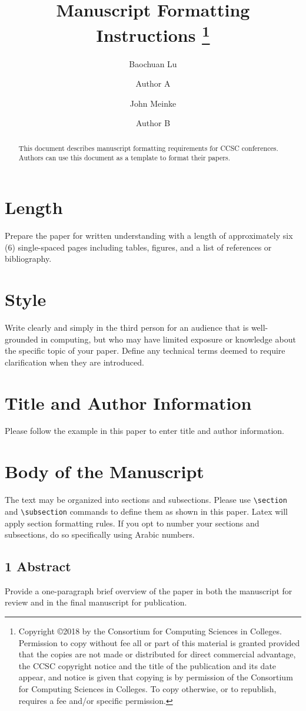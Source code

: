 \documentclass{ccsc_paper}
\title{Manuscript Formatting Instructions
\footnote{
Copyright \copyright 2018 by the Consortium for Computing Sciences in Colleges. Permission to copy without fee all or part of this material is granted provided that the copies are not made or distributed for direct commercial advantage, the CCSC copyright notice and the title of the publication and its date appear, and notice is given that copying is by permission of the Consortium for Computing Sciences in Colleges. To copy otherwise, or to republish, requires a fee and/or specific permission.}}
\author[1]{Baochuan Lu}
\author[1]{Author A}
\author[2]{John Meinke}
\author[2]{Author B}
\affil[1]{\footnotesize
Computer and Information Sciences \protect\\
Southwest Baptist University \protect\\
Bolivar, MO 65613}
\affil[ ]{\textit {\{blu,auther\}@sbuniv.edu}}
\affil[2]{\footnotesize
Computer Science Department \protect\\
Excellent University \protect\\ Our Town, TX 00000}
\affil[ ]{\textit {\{email1,email2,email3,email4,email5\}@xyz.edu}}
\begin{document}
\maketitle

\begin{abstract}
This document describes manuscript formatting requirements for CCSC conferences. Authors can use this document as a template to format their papers.
\end{abstract}

\section{Length}
Prepare the paper for written understanding with a length of approximately six (6) single-spaced pages including tables, figures, and a list of references or bibliography.

\section{Style}
Write clearly and simply in the third person for an audience that is well-grounded in computing, but who may have limited exposure or knowledge about the specific topic of your paper. Define any technical terms deemed to require clarification when they are introduced.

\section{Title and Author Information}
Please follow the example in this paper to enter title and author information.

\section{Body of the Manuscript}
The text may be organized into sections and subsections. Please use \verb+\section+ and  \verb+\subsection+ commands to define them as shown in this paper. Latex will apply section formatting rules. If you opt to number your sections and subsections, do so specifically using Arabic numbers.

\subsection{1 Abstract}
Provide a one-paragraph brief overview of the paper in both the manuscript for review and in the final manuscript for publication.
\end{document}
